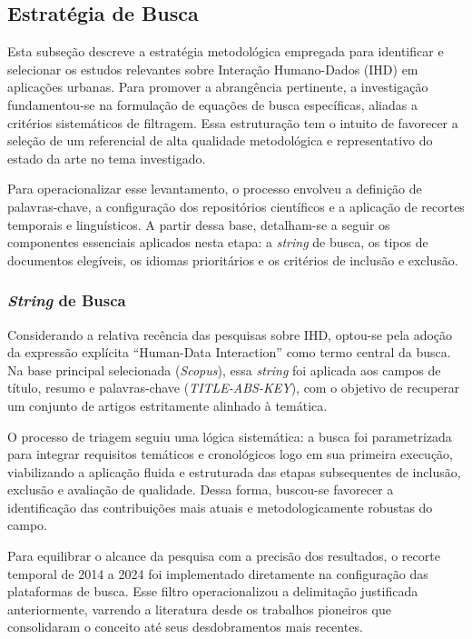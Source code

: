 \documentclass[
	12pt,				%
	oneside,			%
	a4paper,			%
	english,			%
	brazil				%
	]{abntex2ppgsi}
\begin{document}
    \subsection{Estratégia de Busca}
    \label{estrategiaDeBusca}

    Esta subseção descreve a estratégia metodológica empregada para identificar e selecionar os estudos relevantes sobre Interação Humano-Dados (IHD) em aplicações urbanas. Para promover a abrangência pertinente, a investigação fundamentou-se na formulação de equações de busca específicas, aliadas a critérios sistemáticos de filtragem. Essa estruturação tem o intuito de favorecer a seleção de um referencial de alta qualidade metodológica e representativo do estado da arte no tema investigado.

    Para operacionalizar esse levantamento, o processo envolveu a definição de palavras-chave, a configuração dos repositórios científicos e a aplicação de recortes temporais e linguísticos. A partir dessa base, detalham-se a seguir os componentes essenciais aplicados nesta etapa: a \textit{string} de busca, os tipos de documentos elegíveis, os idiomas prioritários e os critérios de inclusão e exclusão.

   \subsubsection{\textit{String} de Busca}

    Considerando a relativa recência das pesquisas sobre IHD, optou-se pela adoção da expressão explícita ``Human-Data Interaction'' como termo central da busca. Na base principal selecionada (\emph{Scopus}), essa \textit{string} foi aplicada aos campos de título, resumo e palavras-chave (\textit{TITLE-ABS-KEY}), com o objetivo de recuperar um conjunto de artigos estritamente alinhado à temática.

    O processo de triagem seguiu uma lógica sistemática: a busca foi parametrizada para integrar requisitos temáticos e cronológicos logo em sua primeira execução, viabilizando a aplicação fluida e estruturada das etapas subsequentes de inclusão, exclusão e avaliação de qualidade. Dessa forma, buscou-se favorecer a identificação das contribuições mais atuais e metodologicamente robustas do campo.

    Para equilibrar o alcance da pesquisa com a precisão dos resultados, o recorte temporal de 2014 a 2024 foi implementado diretamente na configuração das plataformas de busca. Esse filtro operacionalizou a delimitação justificada anteriormente, varrendo a literatura desde os trabalhos pioneiros que consolidaram o conceito até seus desdobramentos mais recentes.
\end{document}
